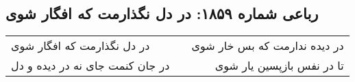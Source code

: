\begin{center}
\section*{رباعی شماره ۱۸۵۹: در دل نگذارمت که افگار شوی}
\label{sec:1859}
\begin{longtable}{l p{0.5cm} r}
در دل نگذارمت که افگار شوی
&&
در دیده ندارمت که بس خار شوی
\\
در جان کنمت جای نه در دیده و دل
&&
تا در نفس بازپسین یار شوی
\\
\end{longtable}
\end{center}
